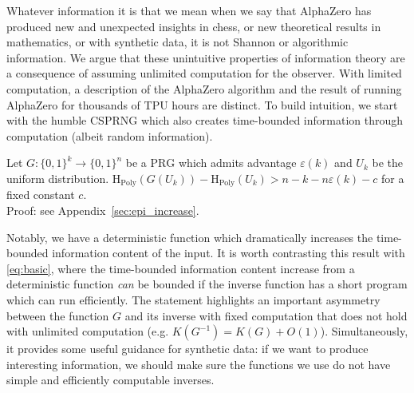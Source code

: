 \documentclass[twoside]{article}
\newcommand{\rH}{\mathrm{H}}
\begin{document}
Whatever information it is that we mean when we say that AlphaZero has produced new and unexpected insights in chess, or new theoretical results in mathematics, or with synthetic data, it is not Shannon or algorithmic information. We argue that these unintuitive properties of information theory are a consequence of assuming unlimited computation for the observer. With limited computation, a description of the AlphaZero algorithm and the result of running AlphaZero for thousands of TPU hours are distinct. To build intuition, we start with the humble CSPRNG which also creates time-bounded information through computation (albeit random information).

%
%
%
%
%
%
\begin{theorem}\label{thm:creation}
    Let $G: \{0,1\}^k \to \{0,1\}^n$ be a $\mathrm{PRG}$ which admits advantage $\varepsilon(k)$ and $U_k$ be the uniform distribution. $\rH_{\mathrm{Poly}}(G(U_k))-\rH_{\mathrm{Poly}}(U_k)> n-k-n\varepsilon(k)-c$ for a fixed constant $c$. \\
    Proof: see Appendix~\ref{sec:epi_increase}.
\end{theorem}

Notably, we have a deterministic function which dramatically increases the time-bounded information content of the input. It is worth contrasting this result with \autoref{eq:basic}, where the time-bounded information content increase from a deterministic function \emph{can} be bounded if the inverse function has a short program which can run efficiently. The statement highlights an important asymmetry between the function $G$ and its inverse with fixed computation that does not hold with unlimited computation (e.g. $K(G^{-1})=K(G)+O(1)$). Simultaneously, it provides some useful guidance for synthetic data: if we want to produce interesting information, we should make sure the functions we use do not have simple and efficiently computable inverses.
%

%
%
%
%

%
%
%
%

%
%
%
%
%
%
%
%
%
%
%
%
%
%
%
%
%
%
%
%
%
%
%
%
%
%
%
%
%


%
%
%
%
%
%
\end{document}
